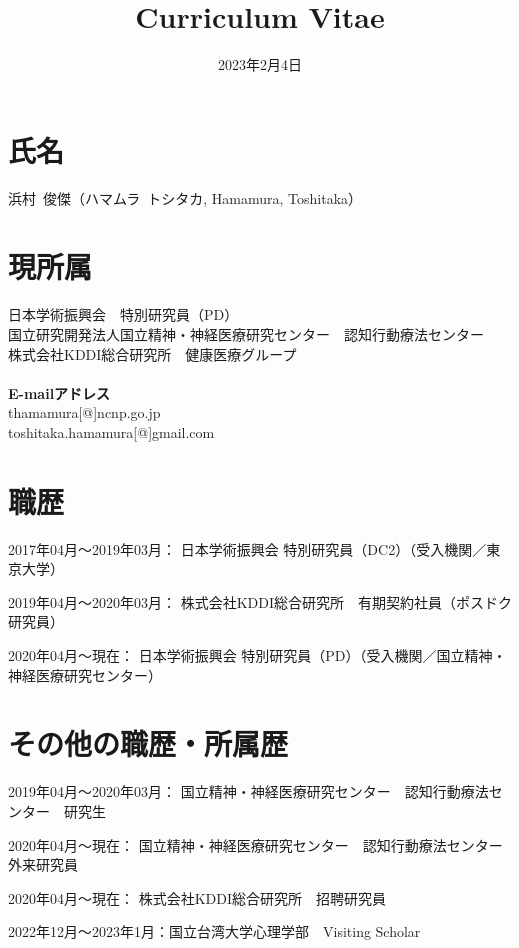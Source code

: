 \documentclass[11pt,a4paper]{article}
\begin{document}
\title{Curriculum Vitae}
\date{2023年2月4日}
\maketitle

\noindent
\section{氏名}
浜村\ 俊傑（ハマムラ\ トシタカ, Hamamura, Toshitaka）
\section{現所属}
日本学術振興会　特別研究員（PD）\\
国立研究開発法人国立精神・神経医療研究センター　認知行動療法センター\\
株式会社KDDI総合研究所　健康医療グループ\\~\\
\textbf{E-mailアドレス}\\
thamamura[@]ncnp.go.jp\\
toshitaka.hamamura[@]gmail.com

\section{職歴}
\begin{description}
	\item 2017年04月～2019年03月： 日本学術振興会 特別研究員（DC2）（受入機関／東京大学）
	\item 2019年04月～2020年03月： 株式会社KDDI総合研究所　有期契約社員（ポスドク研究員）
	\item 2020年04月～現在： 日本学術振興会 特別研究員（PD）（受入機関／国立精神・神経医療研究センター）
\end{description}

\section{その他の職歴・所属歴}
\begin{description}
	\item 2019年04月～2020年03月： 国立精神・神経医療研究センター　認知行動療法センター　研究生
	\item 2020年04月～現在： 国立精神・神経医療研究センター　認知行動療法センター　外来研究員
	\item 2020年04月～現在： 株式会社KDDI総合研究所　招聘研究員
	\item 2022年12月～2023年1月：国立台湾大学心理学部　Visiting Scholar
\end{description}
\end{document}
